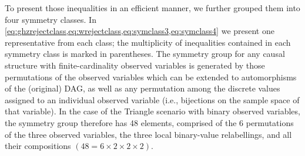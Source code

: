 \documentclass[aps,english,10pt,superscriptaddress,onecolumn,twoside,longbibliography,pra,floatfix,fleqn,nofootinbib]{revtex4-1}
\theoremstyle{definition}
\begin{document}
To present those inequalities in an efficient manner, we further grouped them into four symmetry classes. In \cref{eq:ghzrejectclass,eq:wrejectclass,eq:symclass3,eq:symclass4} we present one representative from each class; the multiplicity of inequalities contained in each symmetry class is marked in parentheses. 
The symmetry group for any causal structure with finite-cardinality observed variables is generated by those permutations of the observed variables which can be extended to automorphisms of the (original) DAG, as well as any permutation among the discrete values assigned to an individual observed variable (i.e., bijections on the sample space of that variable). 
In the case of the Triangle scenario with binary observed variables, the symmetry group therefore has 48 elements, comprised of the 6 permutations of the three observed variables, the three local binary-value relabellings, and all their compositions $(48=6\times 2\times 2\times 2)$. 
\end{document}
